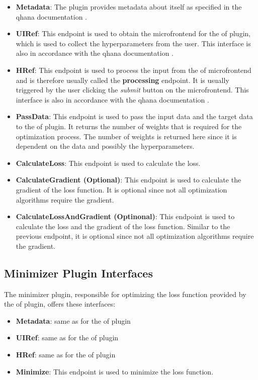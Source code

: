 \documentclass[
  a4paper,  %
  twoside,  %
  bibliography=totoc,
  headsepline,
  cleardoublepage=empty,
  parskip=half,
  draft=false
]{scrbook}
\begin{document}
\begin{itemize}
\item \textbf{Metadata}: The plugin provides metadata about itself as specified in the \gls{qhana} documentation \cite{Buehler2022}.
\item \textbf{UIRef}: This endpoint is used to obtain the microfrontend for the \gls{of} plugin, which is used to collect the hyperparameters from the user.
This interface is also in accordance with the \gls{qhana} documentation \cite{Buehler2022}.
\item \textbf{HRef}: This endpoint is used to process the input from the \gls{of} microfrontend and is therefore usually called the \textbf{processing} endpoint.
It is usually triggered by the user clicking the \emph{submit} button on the microfrontend.
This interface is also in accordance with the \gls{qhana} documentation \cite{Buehler2022}.
\item \textbf{PassData}: This endpoint is used to pass the input data and the target data to the \gls{of} plugin.
It returns the number of weights that is required for the optimization process.
The number of weights is returned here since it is dependent on the data and possibly the hyperparameters.
\item \textbf{CalculateLoss}: This endpoint is used to calculate the loss.
\item \textbf{CalculateGradient (Optional)}: This endpoint is used to calculate the gradient of the loss function. It is optional since not all optimization algorithms require the gradient.
\item \textbf{CalculateLossAndGradient (Optinonal)}: This endpoint is used to calculate the loss and the gradient of the loss function. Similar to the previous endpoint, it is optional since not all optimization algorithms require the gradient.
\end{itemize}

\subsection{Minimizer Plugin Interfaces}

The minimizer plugin, responsible for optimizing the loss function provided by the \gls{of} plugin, offers these interfaces:

\begin{itemize}
  \item \textbf{Metadata}: same as for the \gls{of} plugin
  \item \textbf{UIRef}: same as for the \gls{of} plugin
  \item \textbf{HRef}: same as for the \gls{of} plugin
  \item \textbf{Minimize}: This endpoint is used to minimize the loss function.
\end{itemize}
\end{document}
